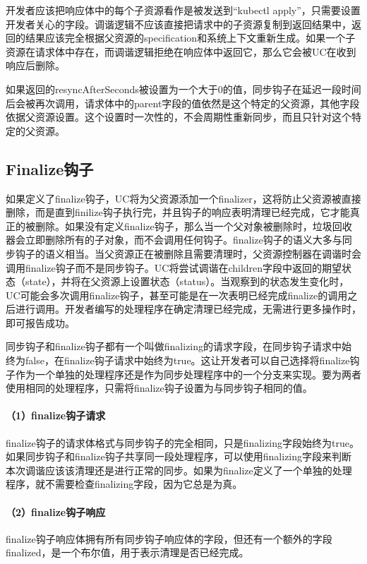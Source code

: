 \documentclass[macfonts,master]{njuthesis}
\begin{document}
开发者应该把响应体中的每个子资源看作是被发送到``kubectl apply''，只需要设置开发者关心的字段。调谐逻辑不应该直接把请求中的子资源复制到返回结果中，返回的结果应该完全根据父资源的specification和系统上下文重新生成。如果一个子资源在请求体中存在，而调谐逻辑拒绝在响应体中返回它，那么它会被UC在收到响应后删除。

如果返回的resyncAfterSeconds被设置为一个大于0的值，同步钩子在延迟一段时间后会被再次调用，请求体中的parent字段的值依然是这个特定的父资源，其他字段依据父资源设置。这个设置时一次性的，不会周期性重新同步，而且只针对这个特定的父资源。

\subsection{Finalize钩子}
如果定义了finalize钩子，UC将为父资源添加一个finalizer，这将防止父资源被直接删除，而是直到finilize钩子执行完，并且钩子的响应表明清理已经完成，它才能真正的被删除。如果没有定义finalize钩子，那么当一个父对象被删除时，垃圾回收器会立即删除所有的子对象，而不会调用任何钩子。finalize钩子的语义大多与同步钩子的语义相当。当父资源正在被删除且需要清理时，父资源控制器在调谐时会调用finalize钩子而不是同步钩子。UC将尝试调谐在children字段中返回的期望状态（state），并将在父资源上设置状态（status）。当观察到的状态发生变化时，UC可能会多次调用finalize钩子，甚至可能是在一次表明已经完成finalize的调用之后进行调用。开发者编写的处理程序在确定清理已经完成，无需进行更多操作时，即可报告成功。

同步钩子和finalize钩子都有一个叫做finalizing的请求字段，在同步钩子请求中始终为false，在finalize钩子请求中始终为true。这让开发者可以自己选择将finalize钩子作为一个单独的处理程序还是作为同步处理程序中的一个分支来实现。要为两者使用相同的处理程序，只需将finalize钩子设置为与同步钩子相同的值。

\paragraph{（1）finalize钩子请求}
finalize钩子的请求体格式与同步钩子的完全相同，只是finalizing字段始终为true。如果同步钩子和finalize钩子共享同一段处理程序，可以使用finalizing字段来判断本次调谐应该该清理还是进行正常的同步。如果为finalize定义了一个单独的处理程序，就不需要检查finalizing字段，因为它总是为真。

\paragraph{（2）finalize钩子响应}
finalize钩子响应体拥有所有同步钩子响应体的字段，但还有一个额外的字段finalized，是一个布尔值，用于表示清理是否已经完成。
\end{document}
